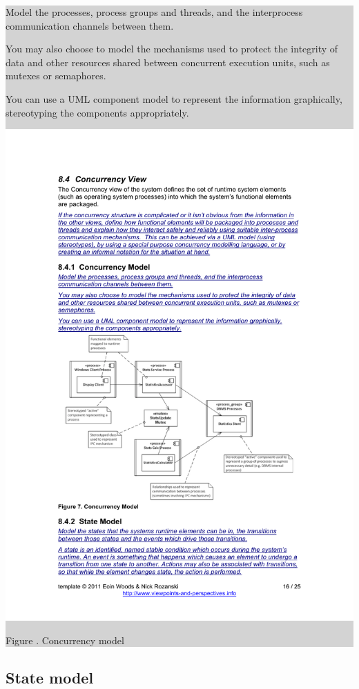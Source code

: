 \documentclass[a4paper,11pt]{report}
\newcommand{\instructions}[1]{
  \noindent\colorbox{lightgray}{%
    \parbox{\linewidth}{%
      #1
    }%
  }%
 \vspace{0.1cm}
}
\newcommand{\mycaption}[1]{
  \addtocounter{figures}{1}
  Figure \arabic{figures}. #1
}
\begin{document}
\instructions{
Model the processes, process groups and threads, and the interprocess
communication channels between them.

You may also choose to model the mechanisms used to protect the
integrity of data and other resources shared between concurrent
execution units, such as mutexes or semaphores.

You can use a UML component model to represent the information
graphically, stereotyping the components appropriately.

\begin{center}
  \includegraphics[width=\textwidth]{figures/concurrencymodel}\\
  \mycaption{Concurrency model}
\end{center}

}

\subsection{State model}
\label{sec:state-model}
\end{document}
